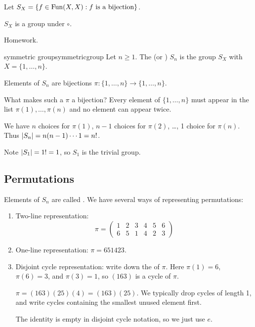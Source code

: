 \documentclass[12pt,letterpaper]{report}
\begin{document}
Let $S_X = \{ f \in \operatorname{Fun}(X, X) : f \text{ is a bijection} \}$.

\begin{prop}{}{}
  $S_X$ is a group under $\circ$.
\end{prop}

\begin{thmproof}
  Homework.
\end{thmproof}

\begin{defn}{symmetric group}{symmetricgroup}
  Let $n \geq 1$.
  The  (or ) $S_n$ is the group $S_X$ with
  $X = \{1, \ldots, n\}$.
\end{defn}

Elements of $S_n$ are bijections $\pi \colon \{1, \ldots, n\} \to \{1, \ldots, n\}$.

What makes such a $\pi$ a bijection?
Every element of $\{1, \ldots, n\}$ must appear in the list $\pi(1), \ldots, \pi(n)$ and no
element can appear twice.

We have $n$ choices for $\pi(1)$, $n - 1$ choices for $\pi(2)$, \dots, 1 choice for $\pi(n)$.
Thus $\lvert S_n\rvert = n(n - 1) \cdots 1 = n!$.

Note $\lvert S_1\rvert = 1! = 1$, so $S_1$ is the trivial group.

\pagebreak
\subsection{Permutations}

Elements of $S_n$ are called .
We have several ways of representing permutations:
\begin{enumerate}
  \item
  Two-line representation:
  \[ \pi = \begin{pmatrix} 1 & 2 & 3 & 4 & 5 & 6 \\ 6 & 5 & 1 & 4 & 2 & 3 \end{pmatrix} \]
  \item
  One-line representation: $\pi = 651423$.
  \item
  Disjoint cycle representation: write down the  of $\pi$.
  Here $\pi(1) = 6$, $\pi(6) = 3$, and $\pi(3) = 1$, so $(163)$ is a cycle of $\pi$.

  $\pi = (163)(25)(4) = (163)(25)$.
  We typically drop cycles of length 1, and write cycles containing the smallest unused element
  first.

  The identity is empty in disjoint cycle notation, so we just use $e$.
\end{enumerate}
\end{document}
